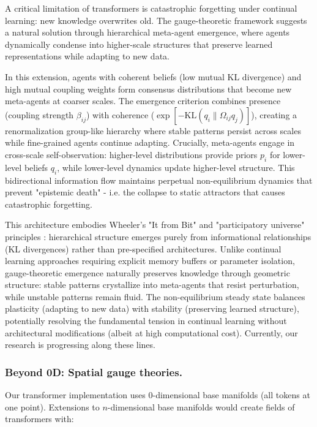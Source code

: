 \documentclass[twoside,11pt]{article}
\begin{document}
A critical limitation of transformers is catastrophic forgetting under continual learning: new knowledge overwrites old. The gauge-theoretic framework suggests a natural solution through hierarchical meta-agent emergence, where agents dynamically condense into higher-scale structures that preserve learned representations while adapting to new data.

In this extension, agents with coherent beliefs (low mutual KL divergence) and high mutual coupling weights form consensus distributions that become new meta-agents at coarser scales. The emergence criterion combines presence (coupling strength $\beta_{ij}$) with coherence ($\exp[-\mathrm{KL}(q_i \| \Omega_{ij} q_j)]$), creating a renormalization group-like hierarchy where stable patterns persist across scales while fine-grained agents continue adapting. Crucially, meta-agents engage in cross-scale self-observation: higher-level distributions provide priors $p_i$ for lower-level beliefs $q_i$, while lower-level dynamics update higher-level structure. This bidirectional information flow maintains perpetual non-equilibrium dynamics that prevent "epistemic death" - i.e. the collapse to static attractors that causes catastrophic forgetting.

This architecture embodies Wheeler's "It from Bit" and "participatory universe" principles \citep{wheeler1990information}: hierarchical structure emerges purely from informational relationships (KL divergences) rather than pre-specified architectures. Unlike continual learning approaches requiring explicit memory buffers or parameter isolation, gauge-theoretic emergence naturally preserves knowledge through geometric structure: stable patterns crystallize into meta-agents that resist perturbation, while unstable patterns remain fluid. The non-equilibrium steady state balances plasticity (adapting to new data) with stability (preserving learned structure), potentially resolving the fundamental tension in continual learning without architectural modifications (albeit at high computational cost). Currently, our research is progressing along these lines.



\subsubsection{Beyond 0D: Spatial gauge theories.} 

Our transformer implementation uses 0-dimensional base manifolds (all tokens at one point). Extensions to $n$-dimensional base manifolds would create fields of transformers with:
\end{document}
